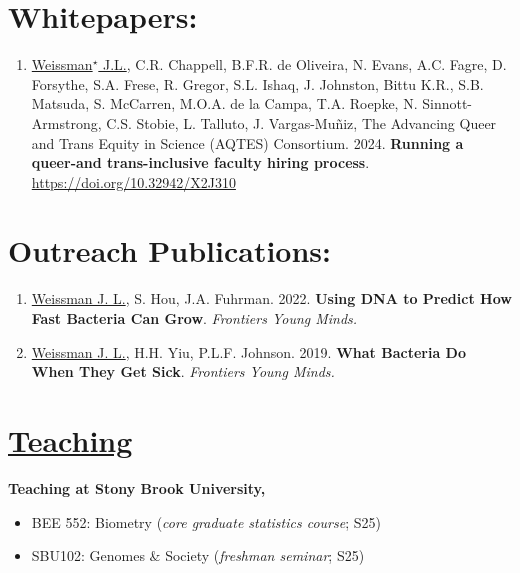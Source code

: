 \documentclass[]{res}
\begin{document}
\begin{resume}
\begin{enumerate}[leftmargin=*]
\end{enumerate} 

\section{Whitepapers:} \vspace{0mm}

 \begin{enumerate}[leftmargin=*]

\item \underline{Weissman$^\star$ J.L.}, C.R. Chappell, B.F.R. de Oliveira, N. Evans, A.C. Fagre, D. Forsythe, S.A. Frese, R. Gregor, S.L. Ishaq, J. Johnston, Bittu K.R., S.B. Matsuda, S. McCarren, M.O.A. de la Campa, T.A. Roepke, N. Sinnott-Armstrong, C.S. Stobie, L. Talluto, J. Vargas-Muñiz, The Advancing Queer and Trans Equity in Science (AQTES) Consortium. 2024. {\bf Running a queer-and trans-inclusive faculty hiring process}. \url{https://doi.org/10.32942/X2J310}

  \end{enumerate} 
 
\section{Outreach Publications:} \vspace{0mm}

 \begin{enumerate}[leftmargin=*]

\item \underline{Weissman J. L.}, S. Hou, J.A. Fuhrman. 2022. {\bf Using DNA to Predict How Fast Bacteria Can Grow}. \emph{Frontiers Young Minds.}

\item \underline{Weissman J. L.}, H.H. Yiu, P.L.F. Johnson. 2019. {\bf What Bacteria Do When They Get Sick}. \emph{Frontiers Young Minds.}

  \end{enumerate} 


\section{\underline{Teaching}} \vspace{2mm}

{\bf Teaching at Stony Brook University,} 
\begin{itemize} \itemsep -2pt
\item BEE 552: Biometry (\emph{core graduate statistics course}; S25)
\item SBU102: Genomes \& Society (\emph{freshman seminar}; S25)
\end{itemize}


\end{resume}
\end{document}

